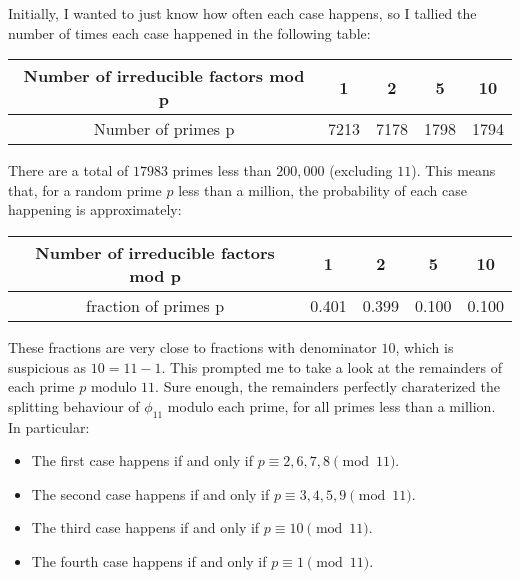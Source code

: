 \documentclass[11pt]{article}
\theoremstyle{definition}
\begin{document}
    \noindent Initially, I wanted to just know how often each case happens, so I tallied the number of times each case happened in the following table:

    \begin{center}
        \begin{tabular}{|c|c|c|c|c|}
            \hline
            Number of irreducible factors mod p & 1 & 2 & 5 & 10 \\
            \hline
            Number of primes p & 7213 & 7178 & 1798 & 1794 \\
            \hline
        \end{tabular}
    \end{center}

    \noindent There are a total of $17983$ primes less than $200,000$ (excluding $11$). This means that,
    for a random prime $p$ less than a million, the probability of each case happening is approximately:

    \begin{center}
        \begin{tabular}{|c|c|c|c|c|}
            \hline
            Number of irreducible factors mod p & 1 & 2 & 5 & 10 \\
            \hline
            fraction of primes p & 0.401 & 0.399 & 0.100 & 0.100 \\
            \hline
        \end{tabular}
    \end{center}

    \noindent These fractions are very close to fractions with denominator $10$, which is suspicious as $10 = 11 - 1$.
    This prompted me to take a look at the remainders of each prime $p$ modulo $11$.
    Sure enough, the remainders perfectly charaterized the splitting behaviour of $\phi_{11}$ modulo each prime,
    for all primes less than a million.
    In particular: \pagebreak

    \begin{itemize}
        \item The first case happens if and only if $p \equiv 2, 6, 7, 8 \pmod{11}$.
        \item The second case happens if and only if $p \equiv 3, 4, 5, 9 \pmod{11}$.
        \item The third case happens if and only if $p \equiv 10 \pmod{11}$.
        \item The fourth case happens if and only if $p \equiv 1 \pmod{11}$.
    \end{itemize}
\end{document}
